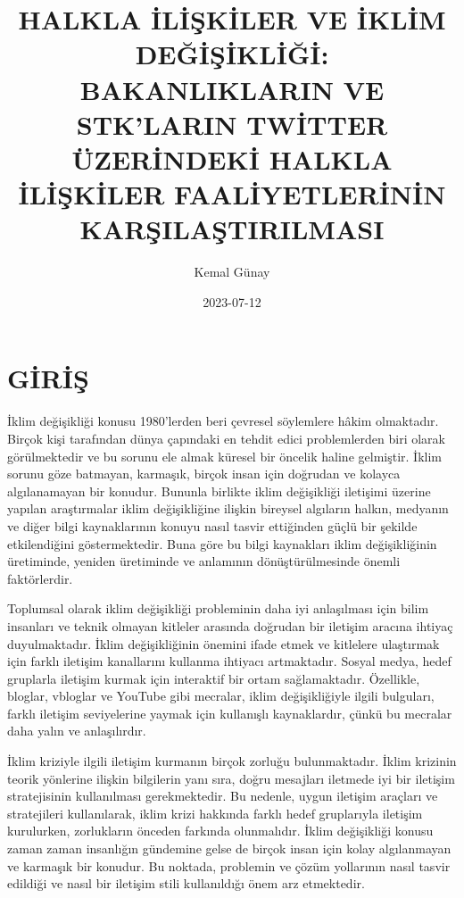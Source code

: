 \documentclass[
]{book}
\title{HALKLA İLİŞKİLER VE İKLİM DEĞİŞİKLİĞİ: BAKANLIKLARIN VE STK'LARIN TWİTTER ÜZERİNDEKİ HALKLA İLİŞKİLER FAALİYETLERİNİN KARŞILAŞTIRILMASI}
\author{Kemal Günay}
\date{2023-07-12}
\begin{document}
\maketitle

{
\setcounter{tocdepth}{1}
\tableofcontents
}
\hypertarget{giriux15f}{%
\chapter*{GİRİŞ}\label{giriux15f}}

İklim değişikliği konusu 1980'lerden beri çevresel söylemlere hâkim olmaktadır. Birçok kişi tarafından dünya çapındaki en tehdit edici problemlerden biri olarak görülmektedir ve bu sorunu ele almak küresel bir öncelik haline gelmiştir. İklim sorunu göze batmayan, karmaşık, birçok insan için doğrudan ve kolayca algılanamayan bir konudur. Bununla birlikte iklim değişikliği iletişimi üzerine yapılan araştırmalar iklim değişikliğine ilişkin bireysel algıların halkın, medyanın ve diğer bilgi kaynaklarının konuyu nasıl tasvir ettiğinden güçlü bir şekilde etkilendiğini göstermektedir. Buna göre bu bilgi kaynakları iklim değişikliğinin üretiminde, yeniden üretiminde ve anlamının dönüştürülmesinde önemli faktörlerdir.\citep{mahl2020bit}

Toplumsal olarak iklim değişikliği probleminin daha iyi anlaşılması için bilim insanları ve teknik olmayan kitleler arasında doğrudan bir iletişim aracına ihtiyaç duyulmaktadır. İklim değişikliğinin önemini ifade etmek ve kitlelere ulaştırmak için farklı iletişim kanallarını kullanma ihtiyacı artmaktadır. Sosyal medya, hedef gruplarla iletişim kurmak için interaktif bir ortam sağlamaktadır. Özellikle, bloglar, vbloglar ve YouTube gibi mecralar, iklim değişikliğiyle ilgili bulguları, farklı iletişim seviyelerine yaymak için kullanışlı kaynaklardır, çünkü bu mecralar daha yalın ve anlaşılırdır. \citep{purath2019blogging}

İklim kriziyle ilgili iletişim kurmanın birçok zorluğu bulunmaktadır. İklim krizinin teorik yönlerine ilişkin bilgilerin yanı sıra, doğru mesajları iletmede iyi bir iletişim stratejisinin kullanılması gerekmektedir. Bu nedenle, uygun iletişim araçları ve stratejileri kullanılarak, iklim krizi hakkında farklı hedef gruplarıyla iletişim kurulurken, zorlukların önceden farkında olunmalıdır. \citep[3]{leal2019overview} İklim değişikliği konusu zaman zaman insanlığın gündemine gelse de birçok insan için kolay algılanmayan ve karmaşık bir konudur. Bu noktada, problemin ve çözüm yollarının nasıl tasvir edildiği ve nasıl bir iletişim stili kullanıldığı önem arz etmektedir.
\end{document}
